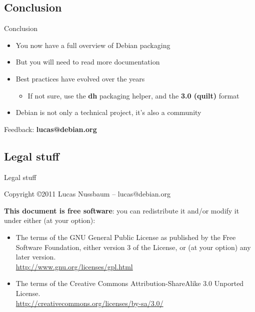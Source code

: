 \documentclass[10pt,final]{beamer}
\begin{document}
\subsection{Conclusion}
\begin{frame}{Conclusion}
  \begin{itemize}
  \item You now have a full overview of Debian packaging
    \br
  \item But you will need to read more documentation
    \br
  \item Best practices have evolved over the years
    \begin{itemize}
    \item If not sure, use the \textbf{dh} packaging helper, and the \textbf{3.0 (quilt)} format
    \end{itemize}
    \br
  \item Debian is not only a technical project, it's also a community
  \end{itemize}
  \vfill
  \centerline{\large Feedback: \textbf{lucas@debian.org}}
\end{frame}

\subsection{Legal stuff}
\begin{frame}{Legal stuff}

  Copyright \copyright 2011 Lucas Nussbaum -- lucas@debian.org
  \br

  {\small 
    \textbf{This document is free software}: you can redistribute it and/or modify
    it under either (at your option):
    \hbr
    \begin{itemize}
    \item The terms of the GNU General Public License as published by the Free
      Software Foundation, either version 3 of the License, or
      (at your option) any later version.\\
      \url{http://www.gnu.org/licenses/gpl.html} \br
    \item The terms of the Creative Commons Attribution-ShareAlike 3.0 Unported
      License.\\ 
      \url{http://creativecommons.org/licenses/by-sa/3.0/}
    \end{itemize}
  }
\end{frame}
\end{document}

